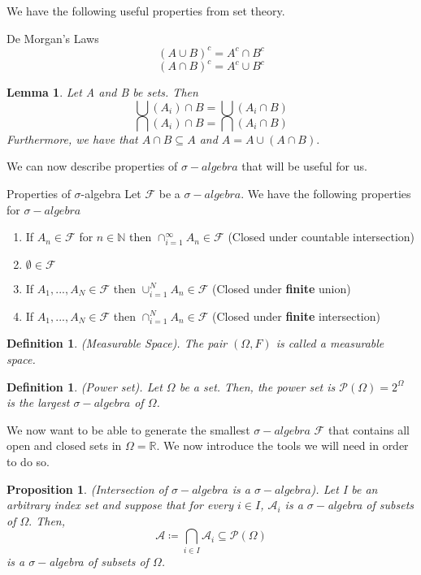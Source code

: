 \documentclass[twoside]{article}
\newtheorem{lemma}[theorem]{Lemma}
\newtheorem{proposition}[theorem]{Proposition}
\newtheorem{definition}[theorem]{Definition}
\newcommand{\sigmalgebra}{\mathcal{F}}
\newcommand{\sa}{\sigma-algebra}
\newcommand{\powerset}{\mathcal{P}}
\begin{document}
We have the following useful properties from set theory.

\begin{definition_exam}{De Morgan's Laws}{}
$$
(A \cup B)^c = A^c \cap B^c
$$
$$
(A \cap B)^c = A^c \cup B^c
$$
\end{definition_exam}

\begin{lemma}Let A and B be sets. Then
$$
\bigcup(A_i) \cap B = \bigcup (A_i \cap B)
$$
$$
\bigcap(A_i) \cap B = \bigcap (A_i \cap B)
$$
Furthermore, we have that $A \cap B \subseteq A$ and 
$
A = A \cup (A \cap B).
$
\end{lemma}

We can now describe properties of $\sa$ that will be useful for us.

\begin{proposition_exam}{Properties of $\sigma$-algebra}{} Let $\sigmalgebra$ be a $\sa$. We have the following properties for $\sa$
\begin{enumerate}
\item If $A_n \in \sigmalgebra$ for $n \in \mathbb{N}$ then $ \cap_{i=1}^{\infty}A_n \in \sigmalgebra$ (Closed under countable intersection)
\item $\emptyset \in \sigmalgebra$
\item If $A_1,...,A_N \in \sigmalgebra$ then $ \cup_{i=1}^{N}A_n \in \sigmalgebra$ (Closed under \textbf{finite} union)
\item If $A_1,...,A_N \in \sigmalgebra$ then $\cap_{i=1}^{N}A_n \in \sigmalgebra$ (Closed under \textbf{finite} intersection)
\end{enumerate}
\end{proposition_exam}

\begin{definition}(Measurable Space). The pair $(\Omega, F)$ is called a measurable space.
\end{definition}

\begin{definition}(Power set). Let $\Omega$ be a set. Then, the power set is $\powerset(\Omega) = 2^{\Omega}$ is the largest $\sa$ of $\Omega$.
\end{definition}

We now want to be able to generate the smallest $\sa$ $\sigmalgebra$ that contains all open and closed sets in $\Omega = \mathbb{R}$. We now introduce the tools we will need in order to do so.


\begin{proposition}(Intersection of $\sa$ is a $\sa$). Let I be an arbitrary index set and suppose that for every $i \in I$, $\mathcal{A}_i$ is a $\sigma-$algebra of subsets of $\Omega.$ Then,
$$
\mathcal{A} \coloneqq \bigcap_{i \in I}\mathcal{A}_i \subseteq \mathcal{P}(\Omega)
$$
is a $\sigma-$algebra of subsets of $\Omega$.
\end{proposition}
\end{document}
